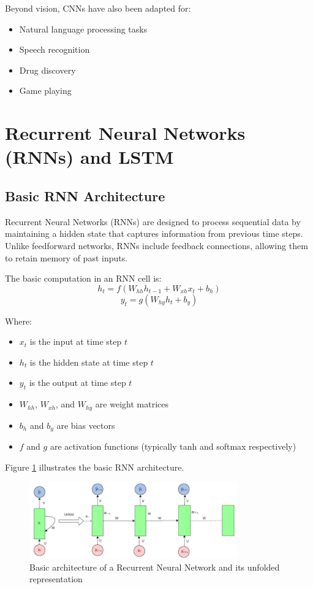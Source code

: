 \documentclass[11pt,a4paper]{report}
\begin{document}
Beyond vision, CNNs have also been adapted for:
\begin{itemize}
    \item Natural language processing tasks
    \item Speech recognition
    \item Drug discovery
    \item Game playing
\end{itemize}

\section{Recurrent Neural Networks (RNNs) and LSTM}

\subsection{Basic RNN Architecture}
Recurrent Neural Networks (RNNs) are designed to process sequential data by maintaining a hidden state that captures information from previous time steps. Unlike feedforward networks, RNNs include feedback connections, allowing them to retain memory of past inputs.

The basic computation in an RNN cell is:
\begin{equation}
h_t = f(W_{hh} h_{t-1} + W_{xh} x_t + b_h)
\end{equation}
\begin{equation}
y_t = g(W_{hy} h_t + b_y)
\end{equation}

Where:
\begin{itemize}
    \item $x_t$ is the input at time step $t$
    \item $h_t$ is the hidden state at time step $t$
    \item $y_t$ is the output at time step $t$
    \item $W_{hh}$, $W_{xh}$, and $W_{hy}$ are weight matrices
    \item $b_h$ and $b_y$ are bias vectors
    \item $f$ and $g$ are activation functions (typically tanh and softmax respectively)
\end{itemize}

Figure \ref{fig:rnn-basic} illustrates the basic RNN architecture.

\begin{figure}[ht]
    \centering
    \includegraphics[width=0.8\textwidth]{rnn_basic_architecture.png}
    \caption{Basic architecture of a Recurrent Neural Network and its unfolded representation}
    \label{fig:rnn-basic}
\end{figure}
\end{document}
